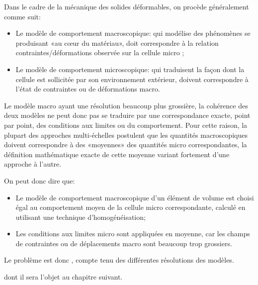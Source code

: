 Dans le cadre de la mécanique des solides déformables, on procède
généralement comme suit:
\begin{itemize}
  \item Le modèle de comportement macroscopique:
	qui modélise des phénomènes se produisant «au cœur du matériau»,
	doit correspondre à la relation contraintes/déformations observée sur la cellule micro ;

  \item Le modèle de comportement microscopique:
	qui traduisent la façon dont la cellule est sollicitée par son environnement
 	extérieur, doivent correspondre à l'état de contraintes ou de déformations macro.
\end{itemize}

Le modèle macro ayant une résolution beaucoup plus grossière, la cohérence des deux
modèles ne peut donc pas se traduire par une correspondance exacte, point par point, des
conditions aux limites ou du comportement. Pour cette raison, la plupart des approches
multi-échelles postulent que les quantités macroscopiques doivent correspondre à des
«moyennes» des quantités micro correspondantes, la définition mathématique exacte de
cette moyenne variant fortement d'une approche à l'autre.

\medskip
{} On peut donc dire que:
\begin{itemize}
  \item Le modèle de comportement macroscopique d'un élément de volume est choisi
	égal au comportement moyen de la cellule micro correspondante, calculé en utilisant
	une technique d'homogénéisation;

  \item Les conditions aux limites micro sont appliquées en moyenne, car les champs de
	contraintes ou de déplacements macro sont beaucoup trop grossiers.
\end{itemize}

\medskip
Le problème est donc , compte tenu des différentes résolutions des modèles.

\medskip
{} 
dont il sera l'objet au chapitre suivant.

\medskip
{}

